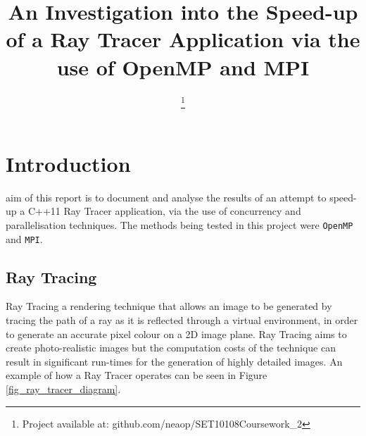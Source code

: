 \documentclass[journal,transmag]{IEEEtran}
\begin{document}
\title{An Investigation into the Speed-up of a Ray Tracer Application via the use of OpenMP and MPI}

\author{

\thanks{Project available at: github.com/neaop/SET10108Coursework\_2}}




\maketitle

\IEEEdisplaynontitleabstractindextext

\IEEEpeerreviewmaketitle

\section{Introduction}
 
	 aim of this report is to document and analyse the results of an attempt to speed-up a C++11 Ray Tracer application, via the use of concurrency and parallelisation techniques. The methods being tested in this project were \texttt{OpenMP} and \texttt{MPI}.
	
	\subsection{Ray Tracing}
		Ray Tracing a rendering technique that allows an image to be generated by tracing the path of a ray as it is reflected through a virtual environment, in order to generate an accurate pixel colour on a 2D image plane. Ray Tracing aims to create photo-realistic images but the computation costs of the technique can result in significant run-times for the generation of highly detailed images. An example of how a Ray Tracer operates can be seen in Figure \ref{fig_ray_tracer_diagram}.
			
\end{document}
